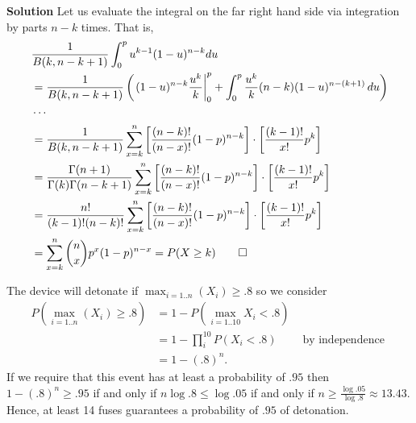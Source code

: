 \documentclass{homework}
\begin{document}

{\bf Solution}
Let us evaluate the integral on the far right hand side via integration by parts $n-k$ times.  That is,
\begin{align*}
&\frac{1}{B(k,n-k+1)}\int_0^pu^{k-1}(1-u)^{n-k}du \\
&=\frac{1}{B(k,n-k+1)}\left( \left. (1-u)^{n-k} \frac{u^k}{k} \right|_0^p + \int_0^p \frac{u^k}{k} (n-k)(1-u)^{n-(k+1)}\,du\right)\\
&\cdots\\
&=\frac{1}{B(k,n-k+1)}\sum_{x=k}^n \left[ \frac{(n-k)!}{(n-x)!}(1-p)^{n-k}\right] \cdot \left[\frac{(k-1)!}{x!}p^k \right]\\
&=\frac{\Gamma(n+1)}{\Gamma(k)\Gamma(n-k+1)}\sum_{x=k}^n \left[ \frac{(n-k)!}{(n-x)!}(1-p)^{n-k}\right] \cdot \left[\frac{(k-1)!}{x!}p^k \right]\\
&=\frac{n!}{(k-1)!(n-k)!}\sum_{x=k}^n \left[ \frac{(n-k)!}{(n-x)!}(1-p)^{n-k}\right] \cdot \left[\frac{(k-1)!}{x!}p^k \right]\\
& = \sum_{x=k}^{n} \binom nxp^x(1-p)^{n-x}  = P(X \ge k)\qed
\end{align*}


\begin{solution}
  The device will detonate if $\max_{i=1..n}(X_i) \ge .8$ so we consider
  \begin{align*}
    P\left(\max_{i=1..n}(X_i) \ge .8\right) &= 1 - P\left(\max_{i=1..10} X_i < .8\right)\\
    &= 1 - \prod_i^{10} P(X_i < .8) & \text{ by independence } \\
    &= 1 - (.8)^n.
  \end{align*}
  If we require that this event has at least a probability of $.95$ then $1 - (.8)^n \ge .95$ if and only if $n \log .8 \le \log .05$ if and only if $n \ge \frac{\log .05}{\log .8} \approx 13.43$. Hence, at least 14 fuses guarantees a probability of $.95$ of detonation.
\end{solution}
\end{document}
